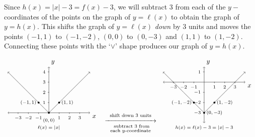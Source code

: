 \documentclass[12pt]{article}
\theoremstyle{definition}
\begin{document}
Since $h(x) = |x| - 3 = f(x) -3$, we will subtract $3$ from each of the $y-$coordinates of the points on the graph of $y=\ell(x)$ to obtain the graph of $y = h(x)$.  This shifts the graph of $y=\ell(x)$ {\it down} by $3$ units and moves the points $(-1,1)$ to $(-1,-2)$, $(0,0)$ to $(0,-3)$ and $(1,1)$ to $(1,-2)$.  Connecting these points with the `$\vee$' shape produces our graph of $y=h(x)$. 

\[ \begin{array}{ccc}

\begin{tikzpicture}[xscale=0.55,yscale=0.55]
	\draw [<->](-4,0) -- coordinate (x axis mid) (4,0) node[below right] {$x$};
	\draw [<->](0,0) -- coordinate (x axis mid) (0,4.5) node[above right] {$y$};
	\draw [->] plot [domain=0:4, samples=100] (\x,{\x});
	\draw [->] plot [domain=0:-4, samples=100] (\x,{-\x});
	\draw[fill] (-1,1) circle (0.08);
	\draw[fill] (1,1) circle (0.08);
	\draw[fill] (0,0) circle (0.08);
	\foreach \x in {-3,...,-1}
	\draw (\x,1pt) -- (\x,-3pt)
	node[anchor=north] {\scriptsize $\x$};
	\foreach \x in {1,...,3}
	\draw (\x,1pt) -- (\x,-3pt)
	node[anchor=north] {\scriptsize $\x$};
	\foreach \y in {1,...,4}
	\draw (1pt,\y) -- (-3pt,\y) 
	node[anchor=east] {\scriptsize $\y$};
	\draw (1,1) node[right] {\scriptsize $(1,1)$}; 
	\draw (-1,1) node[left] {\scriptsize $(-1,1)$}; 
	\draw (0,-0.3) node[below] {\scriptsize $(0,0)$}; 
	\draw (0,-1) node[below] {\scriptsize $\ell(x)=|x|$};  
\end{tikzpicture}
&

\stackrel{\stackrel{\mbox{\scriptsize shift down $3$ units}}{\xrightarrow{\hspace{1in}}}}{\stackrel{\mbox{ \scriptsize subtract $3$ from}}{\mbox{\scriptsize each $y$-coordinate}}} 

&

\begin{tikzpicture}[xscale=0.55,yscale=0.55]
	\draw [<->](-4,0) -- coordinate (x axis mid) (4,0) node[below right] {$x$};
	\draw [<->](0,-4) -- coordinate (x axis mid) (0,1.5) node[above right] {$y$};
	\draw [->] plot [domain=0:4, samples=100] (\x,{\x-3});
	\draw [->] plot [domain=0:-4, samples=100] (\x,{-\x-3});
	\draw[fill] (-1,-2) circle (0.08);
	\draw[fill] (1,-2) circle (0.08);
	\draw[fill] (0,-3) circle (0.08);
	\foreach \x in {-3,...,-1}
	\draw (\x,1pt) -- (\x,-3pt)
	node[anchor=north] {\scriptsize $\x$};
	\foreach \x in {1,...,3}
	\draw (\x,1pt) -- (\x,-3pt)
	node[anchor=north] {\scriptsize $\x$};
	\foreach \y in {1}
	\draw (1pt,\y) -- (-3pt,\y) 
	node[anchor=east] {\scriptsize $\y$};
	\foreach \y in {-1,...,-3}
	\draw (1pt,\y) -- (-3pt,\y) 
	node[anchor=east] {\scriptsize $\y$};
	\draw (1,-2) node[right] {\scriptsize $(1,-2)$}; 
	\draw (-1,-2) node[left] {\scriptsize $(-1,-2)$}; 
	\draw (1,-3) node {\scriptsize $(0,-3)$}; 
	\draw (0,-4) node[below] {\scriptsize $h(x)=\ell(x)-3=|x|-3$};  
\end{tikzpicture}
\end{array}\]
\end{document}
